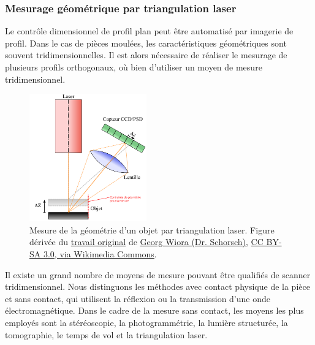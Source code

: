 \subsubsection{Mesurage géométrique par triangulation laser} \label{subsec:scan3D}
Le contrôle dimensionnel de profil plan peut être automatisé par imagerie de profil.
Dans le cas de pièces moulées, les caractéristiques géométriques sont souvent tridimensionnelles.
Il est alors nécessaire de réaliser le mesurage de plusieurs profils orthogonaux, où bien d'utiliser un moyen de mesure tridimensionnel.

\begin{figure}[htbp]
	\centering
	\includegraphics[width=0.45\textwidth]{../Chap2/Figures/Laserprofilometer_FR.pdf}
	\caption[Mesure de la géométrie d'un objet par triangulation laser.]{Mesure de la géométrie d'un objet par triangulation laser. Figure dérivée du \href{https://commons.wikimedia.org/wiki/File:Laserprofilometer_EN.svg}{travail original} de \href{https://de.wikipedia.org/wiki/Benutzer:Xorx}{Georg Wiora (Dr. Schorsch)}, \href{http://creativecommons.org/licenses/by-sa/3.0/}{CC BY-SA 3.0, via Wikimedia Commons}.}
	\label{fig:laser_scanning}
\end{figure}

Il existe un grand nombre de moyens de mesure pouvant être qualifiés de scanner tridimensionnel.
Nous distinguons les méthodes avec contact physique de la pièce et sans contact, qui utilisent la réflexion ou la transmission d'une onde électromagnétique.  %
Dans le cadre de la mesure sans contact, les moyens les plus employés sont la stéréoscopie, la photogrammétrie, la lumière structurée, la tomographie, le temps de vol et la triangulation laser.

